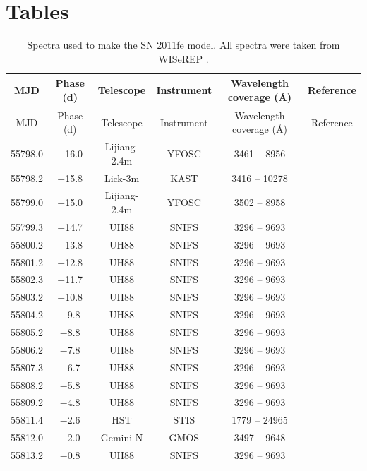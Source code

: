 \documentclass[a4paper,oneside,12pt, class=Latex/Classes/PhDthesisPSnPDF, crop=false]{standalone}
\begin{document}
\section{Tables}
\tiny
\begin{longtable}{cccccc}
 \caption{Spectra used to make the SN 2011fe model. All spectra were taken from WISeREP \citep{wiserep}.}
 \label{11fe_sources}
 \endfirsthead
 \hline
 MJD  & Phase (d) & Telescope & Instrument & Wavelength coverage (\AA) & Reference    \\
 \hline
 \endhead
 \hline
 \endfoot
 \hline
 \endlastfoot
 \hline
 MJD  & Phase (d) & Telescope & Instrument & Wavelength coverage (\AA) & Reference    \\
 \hline
 55798.0 & $-$16.0 & Lijiang-2.4m & YFOSC & 3461 -- 8956 & \citet{spec_Lijiang-2.4m} \\
 55798.2 & $-$15.8 & Lick-3m  & KAST & 3416 -- 10278 & \citet{Nugent_1st_Lick_spec} \\
 55799.0 & $-$15.0 & Lijiang-2.4m & YFOSC & 3502 -- 8958 & \citet{spec_Lijiang-2.4m} \\
 55799.3 & $-$14.7 & UH88   & SNIFS & 3296 -- 9693 & \citet{spec_UH88} \\
 55800.2 & $-$13.8 & UH88   & SNIFS & 3296 -- 9693 & \citet{spec_UH88} \\
 55801.2 & $-$12.8 & UH88   & SNIFS & 3296 -- 9693 & \citet{spec_UH88} \\
 55802.3 & $-$11.7 & UH88   & SNIFS & 3296 -- 9693 & \citet{spec_UH88} \\
 55803.2 & $-$10.8 & UH88   & SNIFS & 3296 -- 9693 & \citet{spec_UH88} \\
 55804.2 & $-$9.8 & UH88   & SNIFS & 3296 -- 9693 & \citet{spec_UH88} \\
 55805.2 & $-$8.8 & UH88   & SNIFS & 3296 -- 9693 & \citet{spec_UH88} \\
 55806.2 & $-$7.8 & UH88   & SNIFS & 3296 -- 9693 & \citet{spec_UH88} \\
 55807.3 & $-$6.7 & UH88   & SNIFS & 3296 -- 9693 & \citet{spec_UH88} \\
 55808.2 & $-$5.8 & UH88   & SNIFS & 3296 -- 9693 & \citet{spec_UH88} \\
 55809.2 & $-$4.8 & UH88   & SNIFS & 3296 -- 9693 & \citet{spec_UH88} \\
 55811.4 & $-$2.6 & HST   & STIS & 1779 -- 24965 & \citet{spec_HST} \\
 55812.0 & $-$2.0 & Gemini-N  & GMOS & 3497 -- 9648 & \citet{spec_Gemini-N} \\
 55813.2 & $-$0.8 & UH88   & SNIFS & 3296 -- 9693 & \citet{spec_UH88} \\

\end{longtable}
\end{document}
